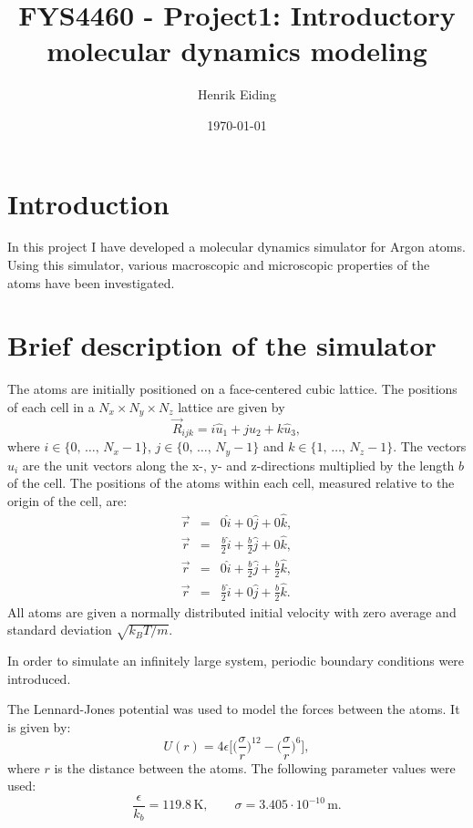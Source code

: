 \documentclass[12pt]{article}
\newcommand{\bdi}{\begin{displaymath}}
\newcommand{\edi}{\end{displaymath}}
\begin{document}
\title{FYS4460 - Project1: Introductory molecular dynamics modeling}
\author{Henrik Eiding}
\date{\today}
\maketitle
\thispagestyle{empty}
\newpage

\section{Introduction}

In this project I have developed a molecular dynamics simulator for Argon atoms. Using this simulator, various macroscopic and microscopic properties of the
atoms have been investigated.

\section{Brief description of the simulator}
The atoms are initially positioned on a face-centered cubic lattice. The positions of each cell in a $N_x \times N_y \times N_z$ lattice are given by
\bdi
\vec{R}_{ijk} = i\hat u_1 + j\hat u_2 + k\hat u_3,
\edi
where $i\in\{0,\,\dots,\,N_x-1\}$, $j\in\{0,\,\dots,\,N_y-1\}$ and $k\in\{1,\,\dots,\,N_z-1\}$. The vectors $\hat u_i$ are the unit vectors along the x-, y- and z-directions multiplied
by the length $b$ of the cell. The positions of the atoms within each cell, measured relative to the origin of the cell, are:
\begin{eqnarray*}
 \vec r & = & 0\hat i + 0\hat j + 0\hat k, \\
 \vec r & = & \frac{b}{2}\hat i + \frac{b}{2}\hat j + 0\hat k, \\
 \vec r & = & 0\hat i + \frac{b}{2}\hat j + \frac{b}{2}\hat k, \\
 \vec r & = & \frac{b}{2}\hat i + 0\hat j + \frac{b}{2}\hat k.
\end{eqnarray*}
All atoms are given a normally distributed initial velocity with zero average and standard deviation $\sqrt{k_BT/m}$.

In order to simulate an infinitely large system, periodic boundary conditions were introduced.

The Lennard-Jones potential was used to model the forces between the atoms. It is given by:
\bdi
U(r) = 4\epsilon\Big[\Big(\frac{\sigma}{r}\Big)^{12} - \Big(\frac{\sigma}{r}\Big)^6\Big],
\edi
where $r$ is the distance between the atoms. The following parameter values were used:
\bdi
\frac{\epsilon}{k_b} = 119.8\,\mathrm{K}, \qquad \sigma = 3.405\cdot10^{-10}\,\mathrm{m}.
\edi
\end{document}

